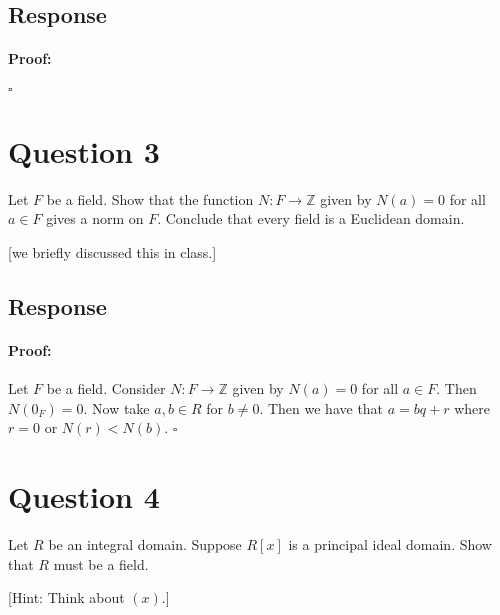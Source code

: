 \documentclass [12pt] {article}
\newcommand{\Z}{\mathbb{Z}}
\newenvironment{proof}{\paragraph{Proof:}}{\hfill$\square$}
\begin{document}
\subsection*{Response}
\begin{proof}
\end{proof}
\newpage

\section*{Question 3}
Let $F$ be a field. Show that the function $N:F\to \Z$ given by $N(a)=0$ for all $a\in F$ gives a
norm on $F$. Conclude that every field is a Euclidean domain.

[we briefly discussed this in class.]
\subsection*{Response}
\begin{proof}
    Let $F$ be a field. Consider $N : F \to \Z$ given by $N(a) = 0$ for all $a \in F$. Then
    $N(0_F) = 0$. Now take $a, b \in R$ for $b \neq 0$. Then we have that $a = bq + r$ where
    $r = 0$ or $N(r) < N(b)$.
\end{proof}
\newpage

\section*{Question 4}
Let $R$ be an integral domain. Suppose $R[x]$ is a principal ideal domain. Show that $R$ must be a
field.

[Hint: Think about $(x)$.]
\end{document}
